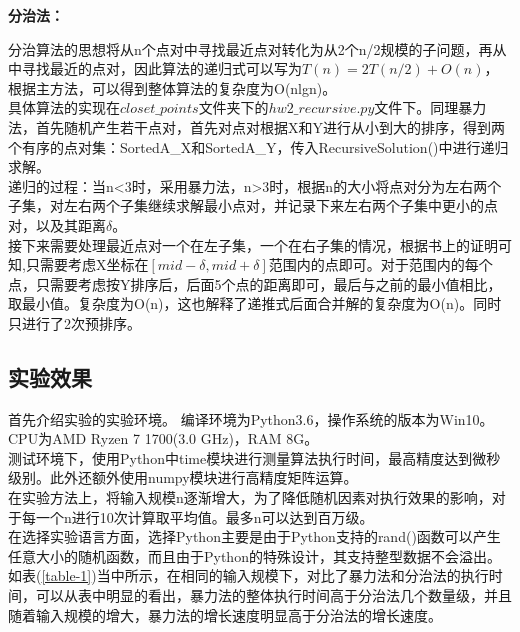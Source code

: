 \documentclass[UTF8]{ctexart}
\begin{document}
\textbf{分治法：}

分治算法的思想将从n个点对中寻找最近点对转化为从2个n/2规模的子问题，再从中寻找最近的点对，因此算法的递归式可以写为$T(n)=2T(n/2)+O(n)$，根据主方法，可以得到整体算法的复杂度为O(nlgn)。\\

具体算法的实现在$closet\_points$文件夹下的$hw2\_recursive.py$文件下。同理暴力法，首先随机产生若干点对，首先对点对根据X和Y进行从小到大的排序，得到两个有序的点对集：SortedA\_X和SortedA\_Y，传入RecursiveSolution()中进行递归求解。\\
递归的过程：当n<3时，采用暴力法，n>3时，根据n的大小将点对分为左右两个子集，对左右两个子集继续求解最小点对，并记录下来左右两个子集中更小的点对，以及其距离$\delta$。\\
接下来需要处理最近点对一个在左子集，一个在右子集的情况，根据书上的证明可知,只需要考虑X坐标在$[mid-\delta, mid+\delta]$范围内的点即可。对于范围内的每个点，只需要考虑按Y排序后，后面5个点的距离即可，最后与之前的最小值相比，取最小值。复杂度为O(n)，这也解释了递推式后面合并解的复杂度为O(n)。同时只进行了2次预排序。

\subsection{实验效果}

首先介绍实验的实验环境。
编译环境为Python3.6，操作系统的版本为Win10。
CPU为AMD Ryzen 7 1700(3.0 GHz)，RAM 8G。\\
测试环境下，使用Python中time模块进行测量算法执行时间，最高精度达到微秒级别。此外还额外使用numpy模块进行高精度矩阵运算。\\
在实验方法上，将输入规模n逐渐增大，为了降低随机因素对执行效果的影响，对于每一个n进行10次计算取平均值。最多n可以达到百万级。\\
在选择实验语言方面，选择Python主要是由于Python支持的rand()函数可以产生任意大小的随机函数，而且由于Python的特殊设计，其支持整型数据不会溢出。\\

如表(\ref{table-1})当中所示，在相同的输入规模下，对比了暴力法和分治法的执行时间，可以从表中明显的看出，暴力法的整体执行时间高于分治法几个数量级，并且随着输入规模的增大，暴力法的增长速度明显高于分治法的增长速度。
\end{document}
